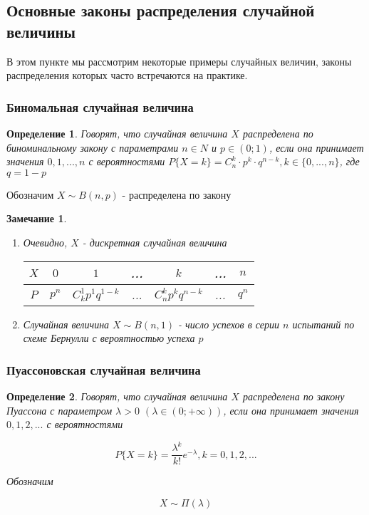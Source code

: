\documentclass[a4paper, 14pt]{report}
\newtheorem{defenition}{Определение}[section]
\newtheorem{note}{Замечание}[section]
\begin{document}
\subsection{Основные законы распределения случайной величины}

В этом пункте мы рассмотрим некоторые примеры случайных величин, законы распределения которых часто встречаются на практике.

\subsubsection{Биномальная случайная величина}

\begin{defenition}
    Говорят, что случайная величина $X$ распределена по биноминальному закону с параметрами $n \in N$ и $p \in (0;1)$, если она принимает значения $0,1,...,n$ с вероятностями $P\{X = k\} = C_n^k \cdot p^k \cdot q^{n-k}, k \in \{0,...,n\}$, где $q = 1-p$
\end{defenition}

Обозначим $X \sim B(n,p)$ - распределена по закону

\begin{note}
    \begin{enumerate}
        \item Очевидно, $X$ - дискретная случайная величина

        \begin{tabular}{|c||c|c|c|c|c|c|}
            \hline
            $X$ & $0$ & $1$ & ... & $k$ & ... & $n$ \\
            \hline
            $P$ & $p^n$ & $C_k^1p^1q^{1-k}$ & ... & $C_n^kp^kq^{n-k}$ & ... & $q^n$ \\
            \hline
        \end{tabular}

    \item Случайная величина $X \sim B(n,1)$ - число успехов в серии $n$ испытаний по схеме Бернулли с вероятностью успеха $p$
    \end{enumerate}
\end{note}

\subsubsection{Пуассоновская случайная величина}

\begin{defenition}
    Говорят, что случайная величина $X$ распределена по закону Пуассона с параметром $\lambda > 0$ $(\lambda \in (0; + \infty))$, если она принимает значения $0,1,2,...$ с вероятностями

    $$
    P\{X=k\} = \frac{\lambda^k}{k!}e^{-\lambda}, k = 0, 1, 2, ...
    $$

    Обозначим

    $$
    X \sim \Pi(\lambda)
    $$
\end{defenition}
\end{document}
